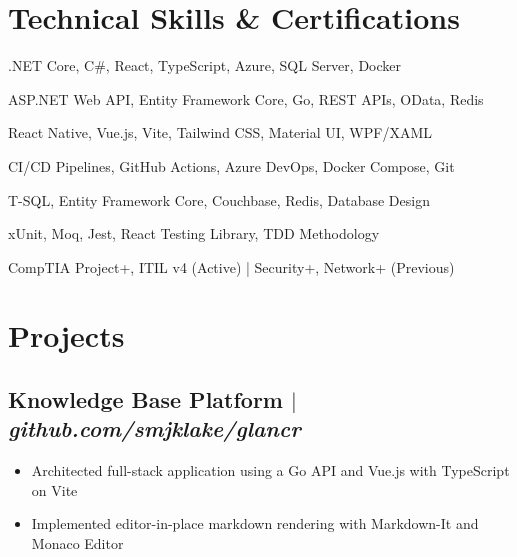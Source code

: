 \documentclass[11pt]{article} %
\begin{document}
\section{Technical Skills \& Certifications}

\begin{description}[itemsep=0pt]
	\item[Core Stack] .NET Core, C\#, React, TypeScript, Azure, SQL Server, Docker
	\item[Backend] ASP.NET Web API, Entity Framework Core, Go, REST APIs, OData, Redis
	\item[Frontend] React Native, Vue.js, Vite, Tailwind CSS, Material UI, WPF/XAML
	\item[DevOps] CI/CD Pipelines, GitHub Actions, Azure DevOps, Docker Compose, Git
	\item[Database] T-SQL, Entity Framework Core, Couchbase, Redis, Database Design
	\item[Testing] xUnit, Moq, Jest, React Testing Library, TDD Methodology
	\item[Certifications] CompTIA Project+, ITIL v4 (Active) | Security+, Network+ (Previous)
\end{description}

\section{Projects}
\subsection{Knowledge Base Platform $|$ \normalfont\textit{github.com/smjklake/glancr}}
\begin{itemize}
  \item Architected full-stack application using a Go API and Vue.js with TypeScript on Vite
  \item Implemented editor-in-place markdown rendering with Markdown-It and Monaco Editor
\end{itemize}
\end{document}
